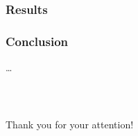 \documentclass[%
  12pt,       				%
	t,                  %
	aspectratio=1610,   %
	unicode,						%
]{beamer}				    	%
\begin{document}
\begin{frame} 
	\frametitle{Results}
	\vspace{1cm}
	
\end{frame}


\begin{frame} 
	\frametitle{Conclusion}
	\dots
\end{frame}


\begin{frame}[c] 
	\frametitle{\mbox{ }}
	\begin{center}
		{\Huge Thank you for your attention!}
	\end{center}
\end{frame}

\end{document}
